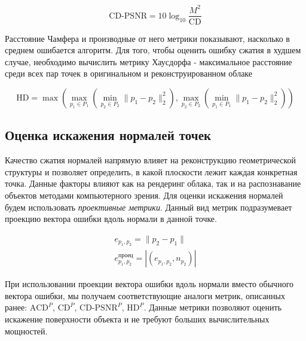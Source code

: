 \begin{equation} \label{eq:cd_psnr_chamfer}
    \text{CD-PSNR} = 10 \log_{10} \frac{M^{2}}{\text{CD}}
\end{equation}


Расстояние Чамфера и производные от него метрики показывают, насколько в среднем
ошибается алгоритм. Для того, чтобы оценить ошибку сжатия в худшем случае,
необходимо вычислить метрику Хаусдорфа - максимальное расстояние среди всех пар
точек в оригинальном и реконструированном облаке

\begin{equation} \label{eq:cloud_hausdorff}
    \text{HD} = \max \left(
        \max_{p_{1} \in P_{1}} \left(
            \min_{p_{2} \in P_{2}} \lVert p_{1} - p_{2} \rVert_{2}^{2}
         \right),
        \max_{p_{2} \in P_{2}} \left(
            \min_{p_{1} \in P_{1}} \lVert p_{1} - p_{2} \rVert_{2}^{2}
         \right)
    \right)
\end{equation}

\subsection{Оценка искажения нормалей точек}


Качество сжатия нормалей напрямую влияет на реконструкцию геометрической
структуры и позволяет определить, в какой плоскости лежит каждая конкретная
точка. Данные факторы влияют как на рендеринг облака, так и на распознавание
объектов методами компьютерного зрения. Для оценки искажения нормалей будем
использовать \textit{проективные метрики}\cite{PCQA}. Данный вид метрик
подразумевает проекцию вектора ошибки вдоль нормали в данной точке.

\begin{gather} \label{eq:point_to_plane_error}
    e_{p_{1}, p_{2}} = \lVert p_{2} - p_{1} \rVert \nonumber \\
    e_{p_{1}, p_{2}}^{\text{проец}} = \left|\left(
        e_{p_{1}, p_{2}}, n_{p_{2}}
    \right)\right|
\end{gather}

При использовании проекции вектора ошибки вдоль нормали вместо обычного вектора
ошибки, мы получаем соответствующие аналоги метрик, описанных ранее:
$\text{ACD}^{P}$, $\text{CD}^{P}$, $\text{CD-PSNR}^{P}$, $\text{HD}^{P}$. Данные
метрики позволяют оценить искажение поверхности объекта и не требуют больших
вычислительных мощностей.

